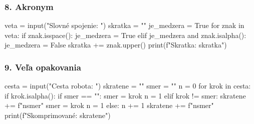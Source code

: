 \subsubsection*{8. Akronym}
\begin{solution}
veta = input("Slovné spojenie: ")
skratka = ""
je_medzera = True
for znak in veta:
	if znak.isspace():
		je_medzera = True
	elif je_medzera and znak.isalpha():
		je_medzera = False
		skratka += znak.upper()
print(f"Skratka: {skratka}")
\end{solution}


\subsubsection*{9. Veľa opakovania}
\begin{solution}
cesta = input("Cesta robota: ")
skratene = ""
smer = ""
n = 0
for krok in cesta:
	if krok.isalpha():
		if smer == "":
			smer = krok
			n = 1
		elif krok != smer:
			skratene += f"{n}{smer}"
			smer = krok
			n = 1
		else:
			n += 1
skratene += f"{n}{smer}"
print(f"Skomprimované: {skratene}")
\end{solution}
